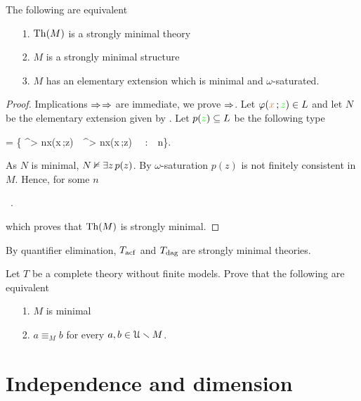 \begin{proposition}\label{prop_fmequivalenzadefinizioni}
The following are equivalent
\begin{itemize}
\item[1.] ${\rm Th}(M)$ is a strongly minimal theory
\item[2.] $M$ is a strongly minimal structure
\item[3.] $M$ has an elementary extension which is minimal and $\omega$-saturated.
\end{itemize}
\end{proposition}
\begin{proof}
Implications $\Rightarrow$$\Rightarrow$ are immediate, we prove $\Rightarrow$.
Let $\varphi({\color{brown} x}\,;{\color{green} z})\in L$ and let $N$ be the elementary extension given by .
Let $p({\color{green} z})\subseteq L$ be the following type

{=}
{\Big\{ \E^{> n}{\mr x}\;\phi({\mr x}\,;{\gr z})\ \wedge\ \E^{> n}{\mr x}\;\neg\phi({\mr x}\,;{\gr z}) \ \ :\ \ n\in\omega\Big\}.}

As $N$ is minimal, $N\nvDash \exists z\,p(z)$.
By $\omega$-saturation $p(z)$ is not finitely consistent in $M$.
Hence, for some $n$ 

{\models}
{\ .}

which proves that ${\rm Th}(M)$ is strongly minimal.
\end{proof}

By quantifier elimination, $T_{\rm acf}$ and $T_{\rm dag}$ are strongly minimal theories.

\begin{exercise}
Let $T$ be a complete theory without finite models.
Prove that the following are equivalent
\begin{itemize}
\item[1.] $M$ is minimal
\item[2.] $a\equiv_M b$ for every $a, b\in \EuScript U\smallsetminus M$.
\end{itemize}
\end{exercise}



\section{Independence and dimension}
\def\medrel#1{\parbox[t]{5ex}{$\displaystyle\hfil #1$}}
\def\ceq#1#2#3{\parbox{35ex}{$\displaystyle #1$}\medrel{#2}$\displaystyle  #3$}


